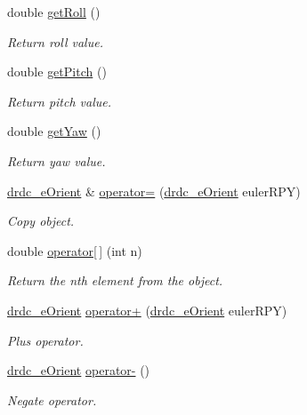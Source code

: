 \begin{CompactItemize}
double \hyperlink{classdrdc__eOrient_2b54493f2d83f6fa9cd4acdfd2713943}{getRoll} ()
\begin{CompactList}\small\item\em Return roll value. \item\end{CompactList}\item 
double \hyperlink{classdrdc__eOrient_20d6a9876fd56273f7b0a7af25e479a9}{getPitch} ()
\begin{CompactList}\small\item\em Return pitch value. \item\end{CompactList}\item 
double \hyperlink{classdrdc__eOrient_53631fe116e11fe4e67b673cc43fd467}{getYaw} ()
\begin{CompactList}\small\item\em Return yaw value. \item\end{CompactList}\item 
\hyperlink{classdrdc__eOrient}{drdc\_\-eOrient} \& \hyperlink{classdrdc__eOrient_47eeb2637992d6acb9abc5e485cc18db}{operator=} (\hyperlink{classdrdc__eOrient}{drdc\_\-eOrient} eulerRPY)
\begin{CompactList}\small\item\em Copy object. \item\end{CompactList}\item 
double \hyperlink{classdrdc__eOrient_1b30d41e012a175029a27eabc8cf5894}{operator\mbox{[}$\,$\mbox{]}} (int n)
\begin{CompactList}\small\item\em Return the nth element from the object. \item\end{CompactList}\item 
\hyperlink{classdrdc__eOrient}{drdc\_\-eOrient} \hyperlink{classdrdc__eOrient_552ee8760c19f896e18ae524d2ee02da}{operator+} (\hyperlink{classdrdc__eOrient}{drdc\_\-eOrient} eulerRPY)
\begin{CompactList}\small\item\em Plus operator. \item\end{CompactList}\item 
\hyperlink{classdrdc__eOrient}{drdc\_\-eOrient} \hyperlink{classdrdc__eOrient_cf3c5f5527caf79346e61bdc8626ee04}{operator-} ()
\begin{CompactList}\small\item\em Negate operator. \item\end{CompactList}\item 

\end{CompactItemize}
